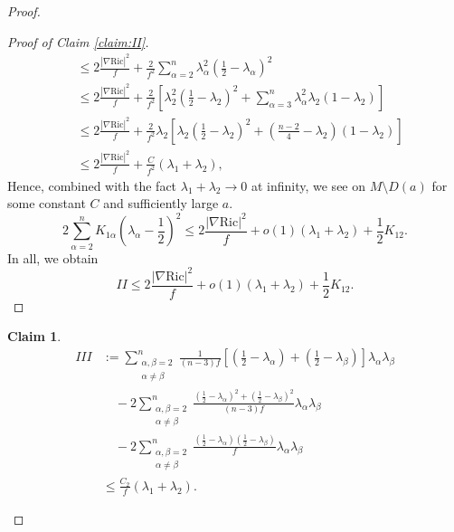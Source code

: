 \documentclass[a4, 12pt]{amsart}
\theoremstyle{plain}
\newtheorem{claim}{Claim}[section]
\begin{document}
\begin{proof}
\begin{proof}[Proof of Claim \ref{claim:II}]
\begin{equation}
\begin{aligned}
			&\leq 2\frac{|\nabla \mathrm{Ric}|^2}{f} + \frac{2}{f^2}\sum_{\alpha=2}^n\lambda_\alpha^2\left(\frac{1}{2} - \lambda_\alpha\right)^2 \\
			&\leq 2\frac{|\nabla \mathrm{Ric}|^2}{f} + \frac{2}{f^2}\left[\lambda_2^2\left(\frac{1}{2} - \lambda_2\right)^2 + \sum_{\alpha=3}^n\lambda_\alpha^2\lambda_2(1-\lambda_2)\right] \\
			&\leq 2\frac{|\nabla \mathrm{Ric}|^2}{f} + \frac{2}{f^2}\lambda_2\left[\lambda_2\left(\frac{1}{2} - \lambda_2\right)^2 + \left(\frac{n-2}{4} - \lambda_2\right)(1-\lambda_2)\right] \\
			&\leq 2\frac{|\nabla \mathrm{Ric}|^2}{f} + \frac{C}{f^2}(\lambda_1+\lambda_2),
		\end{aligned}
	\end{equation}
Hence, combined with the fact $\lambda_1+\lambda_2 \to 0$ at infinity, we see
		on $M \setminus D(a)$ for some constant $C$ and sufficiently large $a$.
		\[
	2\sum_{\alpha=2}^n K_{1\alpha}\left(\lambda_\alpha - \frac{1}{2}\right)^2 \leq 2\frac{|\nabla \mathrm{Ric}|^2}{f} + o(1)(\lambda_1+\lambda_2) + \frac{1}{2}K_{12}.	
		\]%
		In all, we obtain
		\[
		II \leq 2\frac{|\nabla \mathrm{Ric}|^2}{f} + o(1)(\lambda_1+\lambda_2) + \frac{1}{2}K_{12}.
		\]
	\end{proof}
	
	\begin{claim}\label{claim:III}
		\begin{equation*}\label{eq:claim-III}
			\begin{aligned}
				III &:= \sum_{\substack{\alpha,\beta=2 \\ \alpha\neq\beta}}^n \frac{1}{(n-3)f}\left[\left(\frac{1}{2} - \lambda_{\alpha}\right) + \left(\frac{1}{2} - \lambda_{\beta}\right)\right]\lambda_\alpha\lambda_\beta \\
				&\quad - 2\sum_{\substack{\alpha,\beta=2 \\ \alpha\neq\beta}}^n \frac{\left(\frac{1}{2} - \lambda_{\alpha}\right)^2 + \left(\frac{1}{2} - \lambda_{\beta}\right)^2}{(n-3)f}\lambda_\alpha\lambda_\beta \\
				&\quad - 2\sum_{\substack{\alpha,\beta=2 \\ \alpha\neq\beta}}^n \frac{\left(\frac{1}{2} - \lambda_{\alpha}\right)\left(\frac{1}{2} - \lambda_{\beta}\right)}{f}\lambda_\alpha\lambda_\beta \\
				&\leq \frac{C_2}{f}(\lambda_{1}+\lambda_{2}).
			\end{aligned}
		\end{equation*}
	\end{claim}
	

\end{proof}
\end{document}
